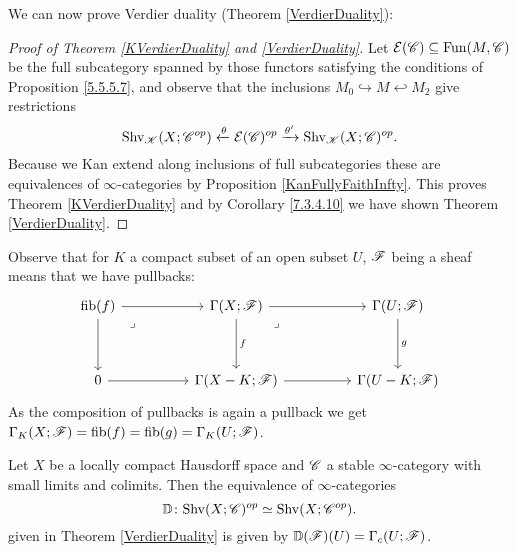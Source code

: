 \documentclass[../../thesis.tex]{subfiles}
\begin{document}
We can now prove Verdier duality (Theorem \ref{VerdierDuality}):
\begin{proof}[Proof of Theorem \ref{KVerdierDuality} and \ref{VerdierDuality}]
    Let $\mathcal{E}(\mathscr{C}) \subseteq \mathrm{Fun}(M,\mathscr{C})$ be the full subcategory spanned by those functors satisfying the conditions of Proposition \ref{5.5.5.7}, and observe that the inclusions $M_0 \hookrightarrow M \hookleftarrow M_2$ give restrictions
    \[
        \mathrm{Shv}_{\mathscr{K}}(X;\mathscr{C}^{op}) \xleftarrow{\theta} \mathcal{E}(\mathscr{C})^{op} \xrightarrow{\theta'} \mathrm{Shv}_{\mathscr{K}}(X;\mathscr{C})^{op}.
    \]
    Because we Kan extend along inclusions of full subcategories these are equivalences of $\infty$-categories by Proposition \ref{KanFullyFaithInfty}.
    This proves Theorem \ref{KVerdierDuality} and by Corollary \ref{7.3.4.10} we have shown Theorem \ref{VerdierDuality}.
\end{proof}
\begin{remark}\label{GammaKXisGammaKU}
    Observe that for $K$ a compact subset of an open subset $U$, $\mathscr{F}$ being a sheaf means that we have pullbacks:
    \[\begin{tikzcd}
            {\fib(f)} && {\Gamma(X;\F)} && {\Gamma(U;\F)} \\
            \\
            0 && {\Gamma(X-K;\F)} && {\Gamma(U-K;\F)}
            \arrow[from=1-3, to=1-5]
            \arrow["f", from=1-3, to=3-3]
            \arrow[from=3-3, to=3-5]
            \arrow["g", from=1-5, to=3-5]
            \arrow["\lrcorner"{anchor=center, pos=0.125}, draw=none, from=1-3, to=3-5]
            \arrow[from=1-1, to=3-1]
            \arrow[from=3-1, to=3-3]
            \arrow[from=1-1, to=1-3]
            \arrow["\lrcorner"{anchor=center, pos=0.125}, draw=none, from=1-1, to=3-3]
        \end{tikzcd}\]
    As the composition of pullbacks is again a pullback we get $\Gamma_K(X;\mathscr{F})=\operatorname{fib}(f)=\operatorname{fib}(g)=\Gamma_K(U;\mathscr{F})$.
\end{remark}
\begin{proposition}[{\cite[Proposition 5.5.5.10]{HA}}]
    Let $X$ be a locally compact Hausdorff space and $\mathscr{C}$ a stable $\infty$-category with small limits and colimits.
    Then the equivalence of $\infty$-categories
    \[
        \mathbb{D} \colon \mathrm{Shv}(X;\mathscr{C})^{op} \simeq \mathrm{Shv}(X;\mathscr{C}^{op}).
    \]
    given in Theorem \ref{VerdierDuality} is given by $\mathbb{D}(\mathscr{F})(U) = \Gamma_c(U;\mathscr{F})$.
\end{proposition}
\end{document}
